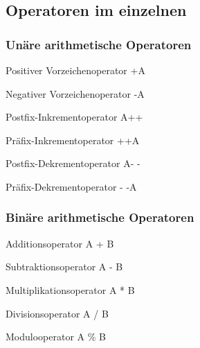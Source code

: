 			\subsection{Operatoren im einzelnen}
				\begin{minipage}[t]{9 cm}
					\subsubsection{Unäre arithmetische Operatoren}
						\begin{compactitem}
							\item Positiver Vorzeichenoperator +A
							\item Negativer Vorzeichenoperator -A
							\item Postfix-Inkrementoperator A++
							\item Präfix-Inkrementoperator ++A
							\item Postfix-Dekrementoperator A- -
							\item Präfix-Dekrementoperator - -A
						\end{compactitem}
				\end{minipage}
				\hspace*{0.5cm}
				\begin{minipage}[t]{9 cm}
					\subsubsection{Binäre arithmetische Operatoren}
						\begin{compactitem}
							\item Additionsoperator A + B
							\item Subtraktionsoperator A - B
							\item Multiplikationsoperator A * B
							\item Divisionsoperator A / B
							\item Modulooperator A \% B   
						\end{compactitem}	
				\end{minipage}\\\\
